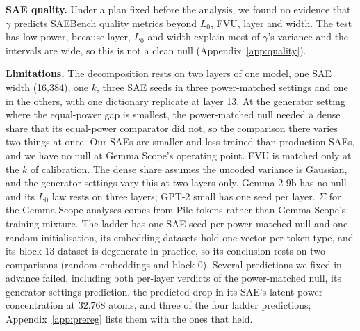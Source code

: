\documentclass{article}
\newcommand{\Sig}{\Sigma}
\newcommand{\Lz}{L_0}
\begin{document}
\textbf{SAE quality.} Under a plan fixed before the analysis, we found no evidence that $\gamma$ predicts SAEBench quality metrics beyond $\Lz$, FVU, layer and width. The test has low power, because layer, $\Lz$ and width explain most of $\gamma$'s variance and the intervals are wide, so this is not a clean null (Appendix~\ref{app:quality}).

\textbf{Limitations.} The decomposition rests on two layers of one model, one SAE width (16,384), one $k$, three SAE seeds in three power-matched settings and one in the others, with one dictionary replicate at layer 13. At the generator setting where the equal-power gap is smallest, the power-matched null needed a dense share that its equal-power comparator did not, so the comparison there varies two things at once. Our SAEs are smaller and less trained than production SAEs, and we have no null at Gemma Scope's operating point. FVU is matched only at the $k$ of calibration. The dense share assumes the uncoded variance is Gaussian, and the generator settings vary this at two layers only. Gemma-2-9b has no null and its $\Lz$ law rests on three layers; GPT-2 small has one seed per layer. $\Sig$ for the Gemma Scope analyses comes from Pile tokens rather than Gemma Scope's training mixture. The ladder has one SAE seed per power-matched null and one random initialisation, its embedding datasets hold one vector per token type, and its block-13 dataset is degenerate in practice, so its conclusion rests on two comparisons (random embeddings and block 0). Several predictions we fixed in advance failed, including both per-layer verdicts of the power-matched null, its generator-settings prediction, the predicted drop in its SAE's latent-power concentration at 32,768 atoms, and three of the four ladder predictions; Appendix~\ref{app:prereg} lists them with the ones that held.
\end{document}
